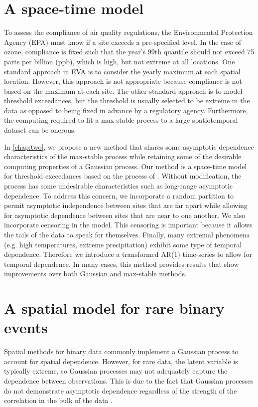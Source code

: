 \section{A space-time \skewt{} model}

To assess the compliance of air quality regulations, the Environmental Protection Agency (EPA) must know if a site exceeds a pre-specified level.
In the case of ozone, compliance is fixed such that the year's 99th quantile should not exceed 75 parts per billion (ppb), which is high, but not extreme at all locations.
One standard approach in EVA is to consider the yearly maximum at each spatial location.
However, this approach is not appropriate because compliance is not based on the maximum at each site.
The other standard approach is to model threshold exceedances, but the threshold is usually selected to be extreme in the data as opposed to being fixed in advance by a regulatory agency.
Furthermore, the computing required to fit a max-stable process to a large spatiotemporal dataset can be onerous.

In \cref{chap:two}, we propose a new method that shares some asymptotic dependence characteristics of the max-stable process while retaining some of the desirable computing properties of a Gaussian process.
Our method is a space-time model for threshold exceedances based on the \skewt{} process of \citet{Azzalini2014}.
Without modification, the \skewt{} process has some undesirable characteristics such as long-range asymptotic dependence.
To address this concern, we incorporate a random partition to permit asymptotic independence between sites that are far apart while allowing for asymptotic dependence between sites that are near to one another.
We also incorporate censoring in the model.
This censoring is important because it allows the tails of the data to speak for themselves. 
Finally, many extremal phenomena (e.g. high temperatures, extreme precipitation) exhibit some type of temporal dependence.
Therefore we introduce a transformed AR(1) time-series to allow for temporal dependence.
In many cases, this method provides results that show improvements over both Gaussian and max-stable methods.

\section{A spatial model for rare binary events}

Spatial methods for binary data commonly implement a Gaussian process to account for spatial dependence.
However, for rare data, the latent variable is typically extreme, so Gaussian processes may not adequately capture the dependence between observations.
This is due to the fact that Gaussian processes do not demonstrate asymptotic dependence regardless of the strength of the correlation in the bulk of the data \citep{Sibuya1960}.

